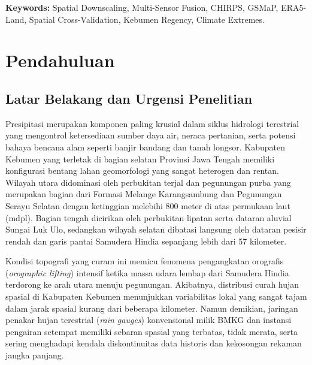 \documentclass[11pt,a4paper,titlepage]{article}
\begin{document}
\vspace{0.4cm}
\noindent \textbf{Keywords:} Spatial Downscaling, Multi-Sensor Fusion, CHIRPS, GSMaP, ERA5-Land, Spatial Cross-Validation, Kebumen Regency, Climate Extremes.

\newpage
{}

\section{Pendahuluan}

\subsection{Latar Belakang dan Urgensi Penelitian}
Presipitasi merupakan komponen paling krusial dalam siklus hidrologi terestrial yang mengontrol ketersediaan sumber daya air, neraca pertanian, serta potensi bahaya bencana alam seperti banjir bandang dan tanah longsor. Kabupaten Kebumen yang terletak di bagian selatan Provinsi Jawa Tengah memiliki konfigurasi bentang lahan geomorfologi yang sangat heterogen dan rentan. Wilayah utara didominasi oleh perbukitan terjal dan pegunungan purba yang merupakan bagian dari Formasi Melange Karangsambung dan Pegunungan Serayu Selatan dengan ketinggian melebihi 800 meter di atas permukaan laut (mdpl). Bagian tengah dicirikan oleh perbukitan lipatan serta dataran aluvial Sungai Luk Ulo, sedangkan wilayah selatan dibatasi langsung oleh dataran pesisir rendah dan garis pantai Samudera Hindia sepanjang lebih dari 57 kilometer.

Kondisi topografi yang curam ini memicu fenomena pengangkatan orografis (\textit{orographic lifting}) intensif ketika massa udara lembap dari Samudera Hindia terdorong ke arah utara menuju pegunungan. Akibatnya, distribusi curah hujan spasial di Kabupaten Kebumen menunjukkan variabilitas lokal yang sangat tajam dalam jarak spasial kurang dari beberapa kilometer. Namun demikian, jaringan penakar hujan terestrial (\textit{rain gauges}) konvensional milik BMKG dan instansi pengairan setempat memiliki sebaran spasial yang terbatas, tidak merata, serta sering menghadapi kendala diskontinuitas data historis dan kekosongan rekaman jangka panjang.
\end{document}
